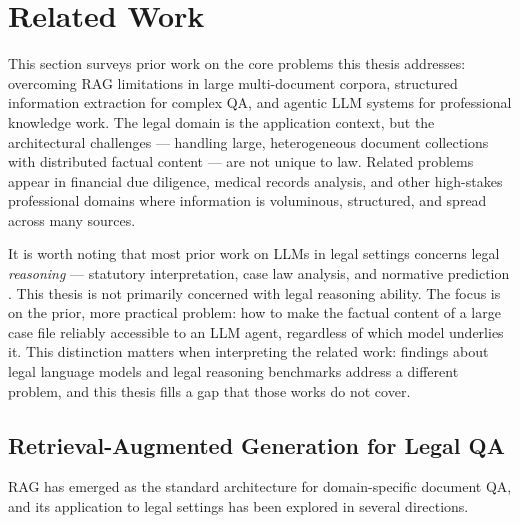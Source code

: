 \section{Related Work}
\label{sec:related-work}

This section surveys prior work on the core problems this thesis addresses: overcoming RAG limitations in large multi-document corpora, structured information extraction for complex QA, and agentic LLM systems for professional knowledge work. The legal domain is the application context, but the architectural challenges --- handling large, heterogeneous document collections with distributed factual content --- are not unique to law. Related problems appear in financial due diligence, medical records analysis, and other high-stakes professional domains where information is voluminous, structured, and spread across many sources.

It is worth noting that most prior work on LLMs in legal settings concerns legal \emph{reasoning} --- statutory interpretation, case law analysis, and normative prediction \cite{chalkidis2020legalbert, guha2023legalbench}. This thesis is not primarily concerned with legal reasoning ability. The focus is on the prior, more practical problem: how to make the factual content of a large case file reliably accessible to an LLM agent, regardless of which model underlies it. This distinction matters when interpreting the related work: findings about legal language models and legal reasoning benchmarks address a different problem, and this thesis fills a gap that those works do not cover.

\subsection{Retrieval-Augmented Generation for Legal QA}

RAG has emerged as the standard architecture for domain-specific document QA, and its application to legal settings has been explored in several directions. 

